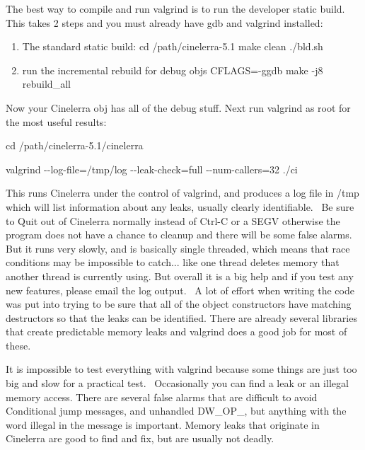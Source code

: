 The best way to compile and run valgrind is to run the developer static build. This takes 2 steps and you must already have gdb and valgrind installed:
\medskip

\begin{enumerate}[nosep]
	\item The standard static build:\newline
		cd /path/cinelerra-5.1\newline
		make clean\newline
		./bld.sh
	\item run the incremental rebuild for debug objs\newline
		CFLAGS=-ggdb make -j8 rebuild\_all
\end{enumerate}
\medskip

Now your Cinelerra obj has all of the debug stuff. Next run valgrind as root for the most useful results:
\smallskip

\hspace{2em}cd /path/cinelerra-5.1/cinelerra

\hspace{2em}valgrind -{}-log-file=/tmp/log -{}-leak-check=full -{}-num-callers=32 ./ci
\medskip

This runs Cinelerra under the control of valgrind, and produces a log file in /tmp which will list information about any leaks, usually clearly identifiable. \ Be sure to Quit out of Cinelerra normally instead of Ctrl-C or a SEGV otherwise the program does not have a chance to cleanup and there will be some false alarms. But it runs very slowly, and is basically single threaded, which means that race conditions may be impossible to catch... like one thread deletes memory that another thread is currently using. But overall it is a big help and if you test any new features, please email the log output. \ A lot of effort when writing the code was put into trying to be sure that all of the object constructors have matching destructors so that the leaks can be identified. There are already several libraries that create predictable memory leaks and valgrind does a good job for most of these.
\medskip

It is impossible to test everything with valgrind because some things are just too big and slow for a practical test. \ Occasionally you can find a leak or an illegal memory access. There are several false alarms that are difficult to avoid {\textquotedbl}Conditional jump{\textquotedbl} messages, and {\textquotedbl}unhandled DW\_OP\_{\textquotedbl}, but anything with the word {\textquotedbl}illegal{\textquotedbl} in the message is important. Memory leaks that originate in Cinelerra are good to find and fix, but are usually not deadly.

